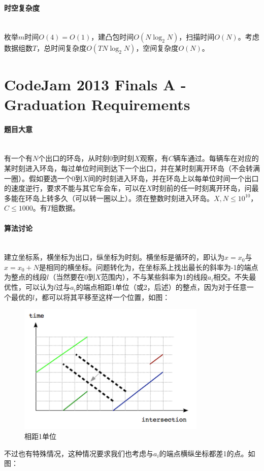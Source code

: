 \documentclass[UTF8]{ctexart}
\newcommand{\myparagraph}[1]{\paragraph{#1}\mbox{}\\}
\theoremstyle{nonumberplain}
\begin{document}
		\myparagraph{时空复杂度}
	
			枚举$m$时间$O(4)=O(1)$，建凸包时间$O(N\log_2N)$，扫描时间$O(N)$。考虑数据组数$T$，总时间复杂度$O(TN\log_2N)$，空间复杂度$O(N)$。
	
	\section{CodeJam 2013 Finals A - Graduation Requirements}
	
		\myparagraph{题目大意}
		
			有一个有$N$个出口的环岛，从时刻0到时刻$X$观察，有$C$辆车通过。每辆车在对应的某时刻进入环岛，每过单位时间到达下一个出口，并在某时刻离开环岛（不会转满一圈）。假如要选一个0到$X$间的时刻进入环岛，并在环岛上以每单位时间一个出口的速度逆行，要求不能与其它车会车，可以在$X$时刻前的任一时刻离开环岛，问最多能在环岛上转多久（可以转一圈以上）。须在整数时刻进入环岛。$X,N \leq 10^{10}$，$C \leq 1000$。有$T$组数据。
		
		\myparagraph{算法讨论}
		
			建立坐标系，横坐标为出口，纵坐标为时刻。横坐标是循环的，即认为$x=x_0$与$x=x_0+N$是相同的横坐标。问题转化为，在坐标系上找出最长的斜率为-1的端点为整点的线段$l$（当然要在0到$X$范围内），不与某些斜率为1的线段$a_i$相交。不失最优性，可以认为$l$过与$a_i$的端点相距1单位（或2，后述）的整点，因为对于任意一个最优的$l$，都可以将其平移至这样一个位置，如图：
			
			\begin{figure}[ht]
				\centering
				\includegraphics[width=0.8\textwidth]{figgcj2013a_1.png}
				\caption{相距1单位}
			\end{figure}
			
			不过也有特殊情况，这种情况要求我们也考虑与$a_i$的端点横纵坐标都差1的点。如图：
			
\end{document}
